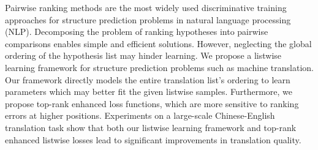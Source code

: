 Pairwise ranking methods are the most widely used discriminative training approaches for structure prediction problems in natural language processing (NLP). Decomposing the problem of ranking hypotheses into pairwise comparisons enables simple and efficient solutions. However, neglecting the global ordering of the hypothesis list may hinder learning. We propose a listwise learning framework for structure prediction problems such as machine translation. Our framework directly models the entire translation list's ordering to learn parameters which may better fit the given listwise samples. Furthermore, we propose top-rank enhanced loss functions, which are more sensitive to ranking errors at higher positions. Experiments on a large-scale Chinese-English translation task show that both our listwise learning framework and top-rank enhanced listwise losses lead to significant improvements in translation quality.
